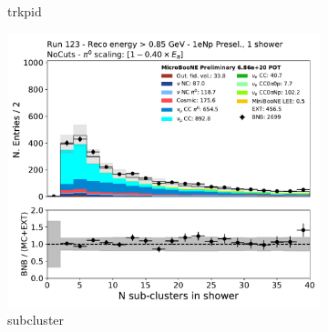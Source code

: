 \begin{figure}[H]
\begin{subfigure}{0.3\textwidth}
    \caption{trkpid}
    \end{subfigure}
    \begin{subfigure}{0.3\textwidth}
    \includegraphics[width=1.0\textwidth]{Sidebands/Figures/1eNp/HighEnergy/HiEext_NPOneShr_None_pi0e040/subcluster.pdf}
    \caption{subcluster}
    \end{subfigure}
    \caption{} 
    \label{fig:HE_1eNp_2}
\end{figure}

